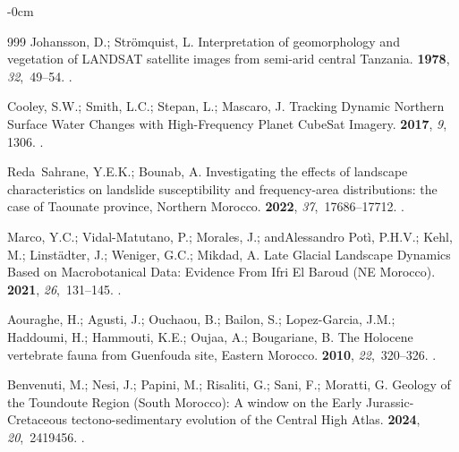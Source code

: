 \documentclass[geomatics,article,accept,pdftex,oneauthor]{Definitions/mdpi}
\begin{document}
\begin{adjustwidth}{-\extralength}{0cm}
\begin{thebibliography}{999}
Johansson, D.; Strömquist, L.
\newblock Interpretation of geomorphology and vegetation of LANDSAT satellite
  images from semi-arid central Tanzania.
  {\bf 1978}, {\em 32},~49--54.
.

Cooley, S.W.; Smith, L.C.; Stepan, L.; Mascaro, J.
\newblock Tracking Dynamic Northern Surface Water Changes with High-Frequency
  Planet CubeSat Imagery.
 {\bf 2017}, {\em 9}, 1306.
.

Reda~Sahrane, Y.E.K.; Bounab, A.
\newblock Investigating the effects of landscape characteristics on landslide
  susceptibility and frequency-area distributions: the case of Taounate
  province, Northern Morocco.
 {\bf 2022}, {\em 37},~17686--17712.
.

Marco, Y.C.; Vidal-Matutano, P.; Morales, J.; andAlessandro Potì, P.H.V.;
  Kehl, M.; Linstädter, J.; Weniger, G.C.; Mikdad, A.
\newblock Late Glacial Landscape Dynamics Based on Macrobotanical Data:
  Evidence From Ifri El Baroud (NE Morocco).
 {\bf 2021}, {\em 26},~131--145.
.

Aouraghe, H.; Agusti, J.; Ouchaou, B.; Bailon, S.; Lopez-Garcia, J.M.;
  Haddoumi, H.; Hammouti, K.E.; Oujaa, A.; Bougariane, B.
\newblock The Holocene vertebrate fauna from Guenfouda site, Eastern Morocco.
 {\bf 2010}, {\em 22},~320--326.
.

Benvenuti, M.; Nesi, J.; Papini, M.; Risaliti, G.; Sani, F.; Moratti, G.
\newblock Geology of the Toundoute Region (South Morocco): A window on the
  Early Jurassic-Cretaceous tectono-sedimentary evolution of the Central High
  Atlas.
 {\bf 2024}, {\em 20},~2419456.
.


\end{thebibliography}
\end{adjustwidth}
\end{document}
